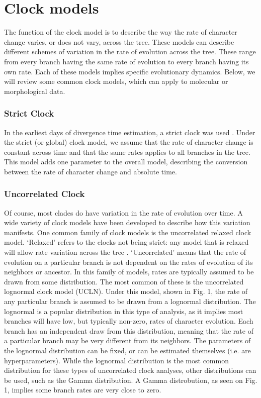 \documentclass[11pt]{article}
\begin{document}
\section{Clock models}
The function of the clock model is to describe the way the rate of character change varies, or does not vary, across the tree.
These models can describe different schemes of variation in the rate of evolution across the tree.
These range from  every branch having the same rate of evolution to every branch having its own rate.
Each of these models implies specific evolutionary dynamics.
Below, we will review some common clock models, which can apply to molecular or morphological data.

\subsubsection{Strict Clock}
In the earliest days of divergence time estimation, a strict clock was used \cite{Zuckerkandl1962, Zuckerkandl1965EvolutionaryDivergenceConvergence}.
Under the strict (or global) clock model, we assume that the rate of character change is constant across time and that the same rates applies to all branches in the tree.
This model adds one parameter to the overall model, describing the conversion between the rate of character change  and absolute time.

\subsubsection{Uncorrelated Clock}
Of course, most clades do have variation in the rate of evolution over time. 
A wide variety of clock models have been developed to describe how this variation manifests.
One common family of clock models is the uncorrelated relaxed clock model.
`Relaxed' refers to the clocks not being strict: any model that is relaxed will allow rate variation across the tree \cite{Drummond2006, Drummond2007}.
`Uncorrelated' means that the rate of evolution on a particular branch is not dependent on the rates of evolution of its neighbors or ancestor.
In this family of models, rates are typically assumed to be drawn from some distribution.
The most common of these is the uncorrelated lognormal clock model (UCLN).
Under this model, shown in Fig. 1, the rate of any particular branch is assumed to be drawn from a lognormal distribution.
The lognormal is a popular distribution in this type of analysis, as it implies most branches will have low, but typically non-zero, rates of character evolution. 
Each branch has an independent draw from this distribution, meaning that the rate of a particular branch may be very different from its neighbors.
The parameters of the lognormal distribution can be fixed, or can be estimated themselves (i.e. are hyperparameters).
While the lognormal distribution is the most common distribution for these types of uncorrelated clock analyses, other distributions can be used, such as the Gamma distribution.
A Gamma distrobution, as seen on Fig. 1, implies some branch rates are very close to zero.
\end{document}
